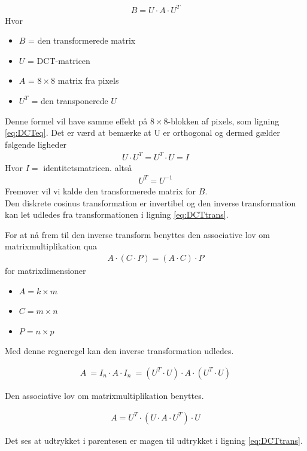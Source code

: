 \begin{align}
B=U \cdot A \cdot U^T
\label{eq:DCTtrans}
\end{align}
Hvor
\begin{itemize}
	\item $B$ = den transformerede matrix
	\item $U$ = DCT-matricen
	\item $A$ = $8\times8$ matrix fra pixels
	\item $U^T$ = den transponerede $U$
\end{itemize}
Denne formel vil have samme effekt på $8\times8$-blokken af pixels, som ligning \vref{eq:DCTeq}.
Det er værd at bemærke at U er orthogonal og dermed gælder følgende ligheder
\begin{align}
U \cdot U^T = U^T \cdot U = I
\label{eq:ortho}
\end{align}
Hvor $I=$ identitetsmatricen.
altså
\begin{align}
U^T=U^{-1}
\end{align}
Fremover vil vi kalde den transformerede matrix for $B$.\\
Den diskrete cosinus transformation er invertibel og den inverse transformation kan let udledes fra transformationen i ligning \vref{eq:DCTtrans}.

For at nå frem til den inverse transform benyttes den associative lov om matrixmultiplikation qua \citet{linalg}
\begin{align}
A \cdot (C \cdot P)=(A \cdot C) \cdot P
\end{align}
for matrixdimensioner
\begin{itemize}
	\item{$A=k \times m$}
	\item{$C=m \times n$}
	\item{$P=n \times p$}
\end{itemize}

Med denne regneregel kan den inverse transformation udledes.

\begin{align}
A
\ =I_n \cdot A \cdot I_n
\ = (U^T \cdot U) \cdot A \cdot (U^T \cdot U)
\end{align}

Den associative lov om matrixmultiplikation benyttes.

\begin{align}
A=U^T \cdot (U \cdot A \cdot U^T) \cdot U
\end{align}

Det ses at udtrykket i parentesen er magen til udtrykket i ligning \vref{eq:DCTtrans}.

